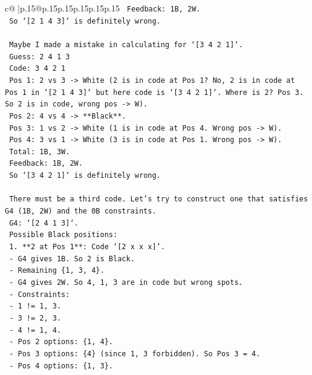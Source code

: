 \documentclass{article}
\begin{document}
{\begin{supertabular}{c@{$\;$}|p{.15\linewidth}@{}p{.15\linewidth}p{.15\linewidth}p{.15\linewidth}p{.15\linewidth}p{.15\linewidth}}
{{{\texttt{    Feedback: 1B, 2W.} \\
\texttt{    So `{[}2 1 4 3{]}` is definitely wrong.} \\
\\ 
\texttt{    Maybe I made a mistake in calculating for `{[}3 4 2 1{]}`.} \\
\texttt{    Guess: 2 4 1 3} \\
\texttt{    Code: 3 4 2 1} \\
\texttt{    Pos 1: 2 vs 3 {-}> White (2 is in code at Pos 1? No, 2 is in code at Pos 1 in `{[}2 1 4 3{]}` but here code is `{[}3 4 2 1{]}`. Where is 2? Pos 3. So 2 is in code, wrong pos {-}> W).} \\
\texttt{    Pos 2: 4 vs 4 {-}> **Black**.} \\
\texttt{    Pos 3: 1 vs 2 {-}> White (1 is in code at Pos 4. Wrong pos {-}> W).} \\
\texttt{    Pos 4: 3 vs 1 {-}> White (3 is in code at Pos 1. Wrong pos {-}> W).} \\
\texttt{    Total: 1B, 3W.} \\
\texttt{    Feedback: 1B, 2W.} \\
\texttt{    So `{[}3 4 2 1{]}` is definitely wrong.} \\
\\ 
\texttt{    There must be a third code. Let's try to construct one that satisfies G4 (1B, 2W) and the 0B constraints.} \\
\texttt{    G4: `{[}2 4 1 3{]}`.} \\
\texttt{    Possible Black positions:} \\
\texttt{    1. **2 at Pos 1**: Code `{[}2 x x x{]}`.} \\
\texttt{       {-} G4 gives 1B. So 2 is Black.} \\
\texttt{       {-} Remaining \{1, 3, 4\}.} \\
\texttt{       {-} G4 gives 2W. So 4, 1, 3 are in code but wrong spots.} \\
\texttt{       {-} Constraints:} \\
\texttt{         {-} 1 != 1, 3.} \\
\texttt{         {-} 3 != 2, 3.} \\
\texttt{         {-} 4 != 1, 4.} \\
\texttt{       {-} Pos 2 options: \{1, 4\}.} \\
\texttt{       {-} Pos 3 options: \{4\} (since 1, 3 forbidden). So Pos 3 = 4.} \\
\texttt{       {-} Pos 4 options: \{1, 3\}.} \\
}}}
\end{supertabular}}
\end{document}
